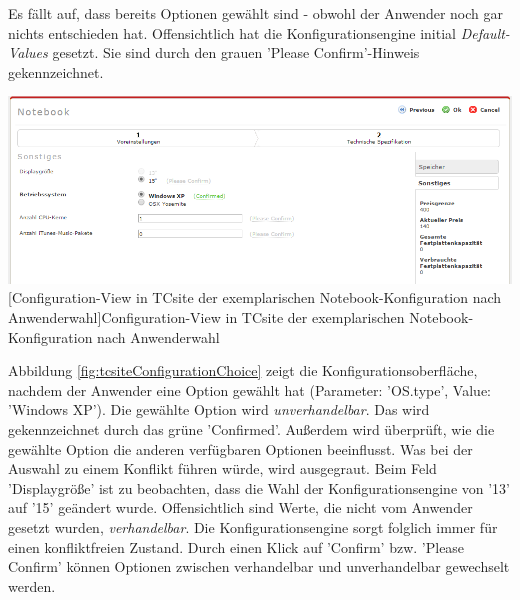 \documentclass[11pt, a4paper, titlepage, listof=totoc, bibliography=totoc, index=totoc, twoside, openright, headings=normal, draft]{scrreprt}
\begin{document}
Es fällt auf, dass bereits Optionen gewählt sind - obwohl der Anwender noch gar nichts entschieden hat. Offensichtlich hat die Konfigurationsengine initial \emph{Default-Values} gesetzt. Sie sind durch den grauen 'Please Confirm'-Hinweis gekennzeichnet.

\vspace{1em}
\begin{minipage}{\linewidth}
	\centering
	\includegraphics[width=1\linewidth]{Abbildungen/tcsiteConfigurationChoice.PNG}
	[Configuration-View in TCsite der exemplarischen Notebook-Konfiguration nach Anwenderwahl]{Configuration-View in TCsite der exemplarischen Notebook-Konfiguration nach Anwenderwahl}
	\label{fig:tcsiteConfigurationChoice}
\end{minipage}
\vspace{0.3em}

Abbildung \ref{fig:tcsiteConfigurationChoice} zeigt die Konfigurationsoberfläche, nachdem der Anwender eine Option gewählt hat (Parameter: 'OS.type', Value: 'Windows XP'). Die gewählte Option wird \emph{unverhandelbar}. Das wird gekennzeichnet durch das grüne 'Confirmed'. Außerdem wird überprüft, wie die gewählte Option die anderen verfügbaren Optionen beeinflusst. Was bei der Auswahl zu einem Konflikt führen würde, wird ausgegraut. Beim Feld 'Displaygröße' ist zu beobachten, dass die Wahl der Konfigurationsengine von '13' auf '15' geändert wurde. Offensichtlich sind Werte, die nicht vom Anwender gesetzt wurden, \emph{verhandelbar}. Die Konfigurationsengine sorgt folglich immer für einen konfliktfreien Zustand. Durch einen Klick auf 'Confirm' bzw. 'Please Confirm' können Optionen zwischen verhandelbar und unverhandelbar gewechselt werden.
\end{document}
